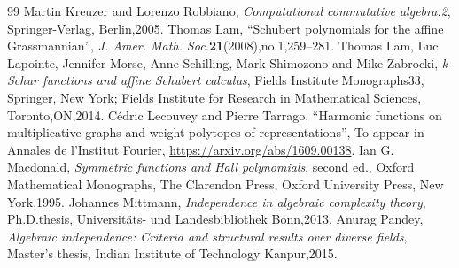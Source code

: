 \documentclass[10pt,a4paper]{amsart}
\theoremstyle{definition}
\begin{document}
\begin{thebibliography}{99}
 Martin Kreuzer and Lorenzo Robbiano, \emph{Computational commutative algebra.2}, Springer-Verlag, Berlin,2005.
 Thomas Lam, ``Schubert polynomials for the affine Grassmannian'', \emph{J. Amer. Math. Soc.}\textbf{21}(2008),no.1,259--281.
 Thomas Lam, Luc Lapointe, Jennifer Morse, Anne Schilling, Mark Shimozono and Mike Zabrocki, \emph{k-Schur functions and affine Schubert calculus}, Fields Institute Monographs33, Springer, New York; Fields Institute for Research in Mathematical Sciences, Toronto,ON,2014.
 Cédric Lecouvey and Pierre Tarrago, ``Harmonic functions on multiplicative graphs and weight polytopes of representations'', To appear in Annales de l'Institut Fourier, \url{https://arxiv.org/abs/1609.00138}.
 Ian G. Macdonald, \emph{Symmetric functions and Hall polynomials}, second ed., Oxford Mathematical Monographs, The Clarendon Press, Oxford University Press, New York,1995.
 Johannes Mittmann, \emph{Independence in algebraic complexity theory}, Ph.D.thesis, Universitäts- und Landesbibliothek Bonn,2013.
 Anurag Pandey, \emph{Algebraic independence: Criteria and structural results over diverse fields}, Master's thesis, Indian Institute of Technology Kanpur,2015.
\end{thebibliography}
\end{document}
